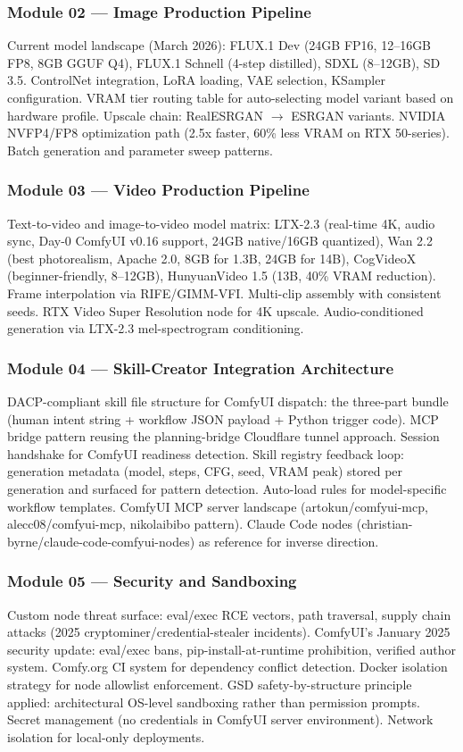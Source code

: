\documentclass[11pt,letterpaper]{article}
\begin{document}
\subsubsection{Module 02 --- Image Production Pipeline}
Current model landscape (March 2026): FLUX.1 Dev (24GB FP16, 12--16GB FP8, 8GB GGUF Q4),
FLUX.1 Schnell (4-step distilled), SDXL (8--12GB), SD 3.5. ControlNet integration, LoRA
loading, VAE selection, KSampler configuration. VRAM tier routing table for auto-selecting
model variant based on hardware profile. Upscale chain: RealESRGAN $\rightarrow$ ESRGAN
variants. NVIDIA NVFP4/FP8 optimization path (2.5x faster, 60\% less VRAM on RTX 50-series).
Batch generation and parameter sweep patterns.

\subsubsection{Module 03 --- Video Production Pipeline}
Text-to-video and image-to-video model matrix: LTX-2.3 (real-time 4K, audio sync,
Day-0 ComfyUI v0.16 support, 24GB native/16GB quantized), Wan 2.2 (best photorealism,
Apache 2.0, 8GB for 1.3B, 24GB for 14B), CogVideoX (beginner-friendly, 8--12GB),
HunyuanVideo 1.5 (13B, 40\% VRAM reduction). Frame interpolation via RIFE/GIMM-VFI.
Multi-clip assembly with consistent seeds. RTX Video Super Resolution node for 4K upscale.
Audio-conditioned generation via LTX-2.3 mel-spectrogram conditioning.

\subsubsection{Module 04 --- Skill-Creator Integration Architecture}
DACP-compliant skill file structure for ComfyUI dispatch: the three-part bundle
(human intent string + workflow JSON payload + Python trigger code). MCP bridge pattern
reusing the planning-bridge Cloudflare tunnel approach. Session handshake for ComfyUI
readiness detection. Skill registry feedback loop: generation metadata (model, steps,
CFG, seed, VRAM peak) stored per generation and surfaced for pattern detection.
Auto-load rules for model-specific workflow templates. ComfyUI MCP server landscape
(artokun/comfyui-mcp, alecc08/comfyui-mcp, nikolaibibo pattern). Claude Code nodes
(christian-byrne/claude-code-comfyui-nodes) as reference for inverse direction.

\subsubsection{Module 05 --- Security and Sandboxing}
Custom node threat surface: eval/exec RCE vectors, path traversal, supply chain
attacks (2025 cryptominer/credential-stealer incidents). ComfyUI's January 2025 security
update: eval/exec bans, pip-install-at-runtime prohibition, verified author system.
Comfy.org CI system for dependency conflict detection. Docker isolation strategy for
node allowlist enforcement. GSD safety-by-structure principle applied: architectural
OS-level sandboxing rather than permission prompts. Secret management (no credentials
in ComfyUI server environment). Network isolation for local-only deployments.
\end{document}
